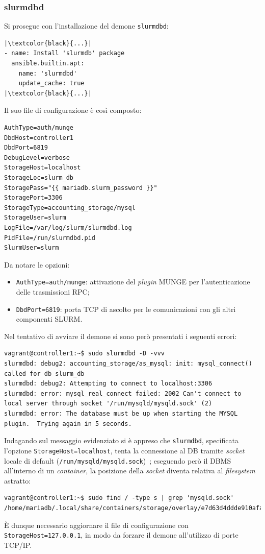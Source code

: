 \documentclass[12pt,a4paper,twoside,openright]{book}
\begin{document}
\subsubsection{slurmdbd}
Si prosegue con l'installazione del demone \texttt{slurmdbd}:
\begin{verbatim}
|\textcolor{black}{...}|
- name: Install 'slurmdb' package
  ansible.builtin.apt:
    name: 'slurmdbd'
    update_cache: true
|\textcolor{black}{...}|
\end{verbatim}
Il suo file di configurazione è così composto:
\begin{verbatim}
AuthType=auth/munge
DbdHost=controller1
DbdPort=6819
DebugLevel=verbose
StorageHost=localhost
StorageLoc=slurm_db
StoragePass="{{ mariadb.slurm_password }}"
StoragePort=3306
StorageType=accounting_storage/mysql
StorageUser=slurm
LogFile=/var/log/slurm/slurmdbd.log
PidFile=/run/slurmdbd.pid
SlurmUser=slurm
\end{verbatim}
Da notare le opzioni:
\begin{itemize}
    \item \texttt{AuthType=auth/munge}: attivazione del \textit{plugin} \ac{MUNGE} per l'autenticazione delle trasmissioni \ac{RPC};
    \item \texttt{DbdPort=6819}: porta \ac{TCP} di ascolto per le comunicazioni con gli altri componenti \ac{SLURM}.
\end{itemize}

Nel tentativo di avviare il demone si sono però presentati i seguenti errori:
\begin{verbatim}
vagrant@controller1:~$ sudo slurmdbd -D -vvv
slurmdbd: debug2: accounting_storage/as_mysql: init: mysql_connect() called for db slurm_db
slurmdbd: debug2: Attempting to connect to localhost:3306
slurmdbd: error: mysql_real_connect failed: 2002 Can't connect to local server through socket '/run/mysqld/mysqld.sock' (2)
slurmdbd: error: The database must be up when starting the MYSQL plugin.  Trying again in 5 seconds.
\end{verbatim}
Indagando sul messaggio evidenziato si è appreso che \texttt{slurmdbd}, specificata l'opzione \texttt{StorageHost=localhost}, tenta la connessione al \ac{DB} tramite \textit{socket} locale di default (\texttt{/run/mysqld/mysqld.sock})~\cite{slurmaccounting}; eseguendo però il \ac{DBMS} all'interno di un \textit{container}, la posizione della \textit{socket} diventa relativa al \textit{filesystem} astratto:
\begin{verbatim}
vagrant@controller1:~$ sudo find / -type s | grep 'mysqld.sock'
/home/mariadb/.local/share/containers/storage/overlay/e7d63d4ddde910afaf1d2574c3345fc74c42372bffc95f84528ead29c2f52d7e/diff/run/mysqld/mysqld.sock
\end{verbatim}
È dunque necessario aggiornare il file di configurazione con \texttt{StorageHost=127.0.0.1}, in modo da forzare il demone all'utilizzo di porte \ac{TCP}/\ac{IP}.
\end{document}
